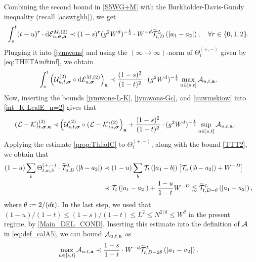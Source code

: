Combining the second bound in \eqref{S5WG+M} with the Burkholder-Davis-Gundy inequality (recall \eqref{aaswtghh}), we get   
 \begin{align*}
\int_{s}^t (t-u)^r\cdot 
\dd \mathcal{E}^{M,(2)}_{u, \bsig, {{\ba}}} \prec (1-s)^r (\ilambda^2W^{d})^{-\frac14} \cdot W^{-d}    \widetilde{{\cal T}}^{L} _{t,D}\p{|a_1-a_2|},\quad \forall r\in\{0,1,2\}.  
 \end{align*}
Plugging it into \eqref{jymwons} and using the $(\infty\to \infty)$-norm of $\Theta_t^{(+,-)}$ given by \eqref{eq:THETAinftinf}, we obtain 
\begin{align}\label{uuwmskiow}
\int_{s}^t \left(\mathcal{U}^{(2)}_{u, t, \bsig} \circ \dd\mathcal{E}^{M,(2)}_{u, \bsig}\right)_{{\ba}}
\prec \frac{(1-s)^2}{(1-t)^2} \cdot (\ilambda^2W^{d})^{-\frac14} \max_{u\in[s,t]}{\cal A}_{u,t, \ba}.
 \end{align}
Now, inserting the bounds \eqref{jymwons-L-K}, \eqref{jymwons-Gc}, and \eqref{uuwmskiow} into \eqref{int_K-LcalE_n=2} gives that 
\begin{align}\label{iois-mtx}
(\mathcal{L} - \mathcal{K})^{(2)}_{t, \bsig, {\ba}} \prec &
    \left(\mathcal{U}^{(2)}_{s, t, \bsig} \circ (\mathcal{L} - \mathcal{K})^{(2)}_{s, \bsig}\right)_{{\ba}}+ \frac{(1-s)^2}{(1-t)^2}\cdot (\ilambda^2W^{d})^{-\frac14} \sup_{u\in [s,t]} {\cal A}_{u,t,{\ba}}  .
\end{align}
Applying the estimate \eqref{prop:ThfadC} to $\Theta_t^{(+,-)}$, along with the bound \eqref{TTT2}, we obtain that
\begin{align}\label{uwp2-92kj}
 (1-u) \sum_b \Theta_{t,a_1b}^{(+,-)} \cdot \widetilde{  \cal T}^{L}_{u,D}\p{|b-a_2|} &\prec (1-u)\sum_b \cal T_{t}\p{|a_1-b|} \br{\cal T_{u}\p{|b-a_2|} +W^{-D}} \nonumber\\
 &\prec \cal T_{t}\p{|a_1-a_2|} + \frac{1-u}{1-t}W^{-D} \lesssim \widetilde{  \cal T}^{L}_{t,D-\theta}\p{|a_1-a_2|},
\end{align}
where $\theta:=2/(d\fc)$. In the last step, we used that $(1-u)/(1-t)\le (1-s)/(1-t)\le L^2\le N^{2/d}\le W^{\theta}$ in the present regime, by \eqref{Main_DEL_COND}.
Inserting this estimate into the definition of $\cal A$ in \eqref{eq:def_calA5}, we can bound ${\cal A}_{u,t,{\ba}}$ as   
\begin{align}\label{uwftgwesj}
\max_{u\in [s,t]} {\cal A}_{u,t,{\ba}}\prec \frac{1-s}{1-t}\cdot W^{-d}\widetilde{  \cal T}^{L}_{t,D-2\theta}\p{|a_1-a_2|}.
\end{align}
